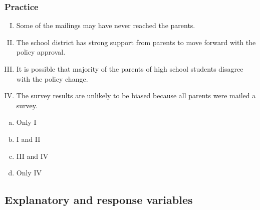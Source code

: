 
\begin{frame}[shrink]
\frametitle{Practice}

{\small
{}

\begin{enumerate}[I.]
\item Some of the mailings may have never reached the parents.
\item The school district has strong support from parents to move forward with the policy approval.
\item It is possible that majority of the parents of high school students disagree with the policy change.
\item The survey results are unlikely to be biased because all parents were mailed a survey. 
\end{enumerate}

\begin{multicols}{5}
\begin{enumerate}[(a)]
\item Only I
\item I and II
\item III and IV
\item Only IV
\end{enumerate}
\end{multicols}
}

\end{frame}


\subsection{Explanatory and response variables}


